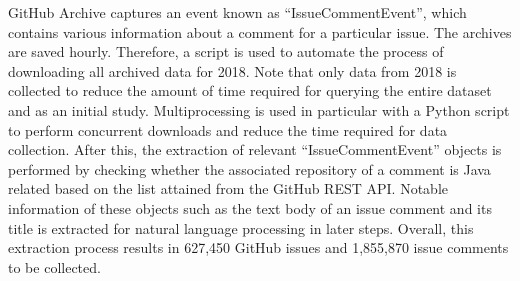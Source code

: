 GitHub Archive captures an event known as ``IssueCommentEvent'', which contains various information about a comment for a particular issue. The archives are saved hourly. Therefore, a script is used to automate the process of downloading all archived data for 2018. Note that only data from 2018 is collected to reduce the amount of time required for querying the entire dataset and as an initial study. Multiprocessing is used in particular with a Python script to perform concurrent downloads and reduce the time required for data collection. After this, the extraction of relevant ``IssueCommentEvent'' objects is performed by checking whether the associated repository of a comment is Java related based on the list attained from the GitHub REST API. Notable information of these objects such as the text body of an issue comment and its title is extracted for natural language processing in later steps. Overall, this extraction process results in 627,450 GitHub issues and 1,855,870 issue comments to be collected.

